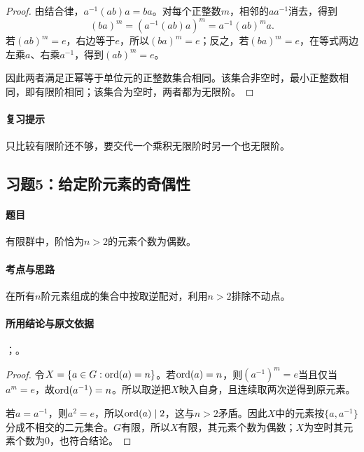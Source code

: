 
\begin{proof}
由结合律，$a^{-1}(ab)a=ba$。对每个正整数$m$，相邻的$aa^{-1}$消去，得到
\[
(ba)^m=(a^{-1}(ab)a)^m=a^{-1}(ab)^ma.
\]
若$(ab)^m=e$，右边等于$e$，所以$(ba)^m=e$；反之，若$(ba)^m=e$，在等式两边左乘$a$、右乘$a^{-1}$，得到$(ab)^m=e$。

因此两者满足正幂等于单位元的正整数集合相同。该集合非空时，最小正整数相同，即有限阶相同；该集合为空时，两者都为无限阶。
\end{proof}

\paragraph{复习提示}
只比较有限阶还不够，要交代一个乘积无限阶时另一个也无限阶。


\subsection{习题5：\texorpdfstring{给定阶元素的奇偶性}{给定阶元素的奇偶性}}
\label{ex:2:5}

\paragraph{题目}
有限群中，阶恰为$n>2$的元素个数为偶数。

\paragraph{考点与思路}
在所有$n$阶元素组成的集合中按取逆配对，利用$n>2$排除不动点。

\paragraph{所用结论与原文依据}
；。


\begin{proof}
令$X=\{a\in G:\operatorname{ord}(a)=n\}$。若$\operatorname{ord}(a)=n$，则$(a^{-1})^m=e$当且仅当$a^m=e$，故$\operatorname{ord}(a^{-1})=n$。所以取逆把$X$映入自身，且连续取两次逆得到原元素。

若$a=a^{-1}$，则$a^2=e$，所以$\operatorname{ord}(a)\mid2$，这与$n>2$矛盾。因此$X$中的元素按$\{a,a^{-1}\}$分成不相交的二元集合。$G$有限，所以$X$有限，其元素个数为偶数；$X$为空时其元素个数为0，也符合结论。
\end{proof}

